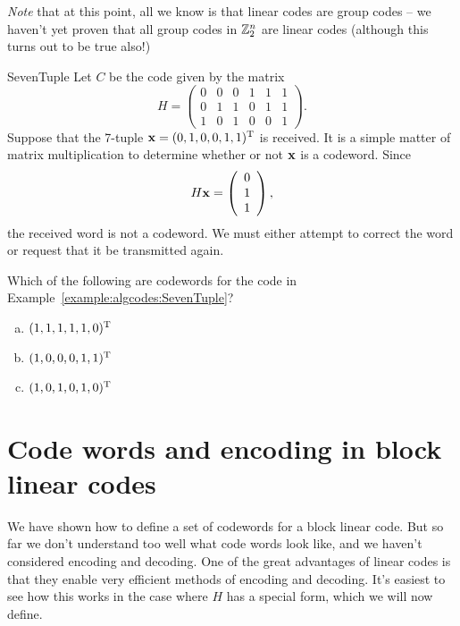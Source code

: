  \noindent
\emph{Note} that at this point, all we know is that linear codes are group codes -- we haven't yet proven that all group codes in ${\Bbb Z}_2^n$ are linear codes (although this turns out to be true also!)
 
\begin{example}{SevenTuple}
Let $C$ be the code given by the matrix
\[
H =
\left(
\begin{array}{cccccc}
0 & 0 & 0 & 1 & 1 & 1 \\
0 & 1 & 1 & 0 & 1 & 1 \\
1 & 0 & 1 & 0 & 0 & 1
\end{array}
\right).
\]
Suppose that the 7-tuple ${\bold x} = (0,1,0,0,1,1)^{\rm T}$ is received.
It is a simple matter of matrix multiplication to determine whether or
not ${\bold x}$ is a codeword. Since 
\[
H{\bold x} =
\left(
\begin{array}{c}
0 \\
1 \\
1
\end{array}
\right),
\]
the received word is not a codeword.  We must either attempt to
correct the word or request that it be transmitted again.
\end{example}

\begin{exercise}{}
Which of the following are codewords for the code in Example~\ref{example:algcodes:SevenTuple}?
\begin{enumerate}[(a)]
\item
$(1,1,1,1,1,0)^{\rm T}$
\item
$(1,0,0,0,1,1)^{\rm T}$
\item
$(1,0,1,0,1,0)^{\rm T}$
\end{enumerate}
\end{exercise}


 
\section{Code words and encoding in block linear codes}
 
We have shown how to define a set of codewords for a block linear code. But so far we don't understand too well what code words look like, and we haven't considered encoding and decoding. One of the great advantages of linear codes is that they enable  very efficient methods of encoding and decoding.  It's easiest to see how this works in the case where $H$ has a special form, which we will now define.

